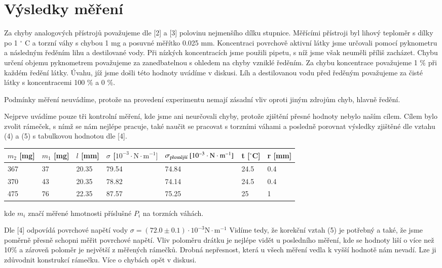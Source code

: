 \documentclass[a4paper]{article}
\begin{document}
\section*{Výsledky měření}
\par Za chyby analogových přístrojů považujeme dle [2] a [3] polovinu nejmenšího dílku stupnice. Měřícími přístroji byl lihový teploměr s dílky po 1 $^\circ$ C a torzní váhy s chybou 1 mg a posuvné měřítko 0.025 mm. Koncentraci povrchově aktivní látky jsme určovali pomocí pyknometru a následným ředěním lihu a destilované vody. Při nízkých koncentracích jsme použili pipetu, s níž jsme však neuměli příliš zacházet. Chybu určení objemu pyknometrem považujeme za zanedbatelnou s ohledem na chyby vzniklé ředěním. Za chybu koncentrace považujeme 1 $\%$ při každém ředění látky. Úvahu, jíž jsme došli této hodnoty uvádíme v diskusi. Líh a destilovanou vodu před ředěným považujeme za čisté látky s koncentracemi 100 $\%$ a 0 $\%$.
\par Podmínky měření neuvádíme, protože na provedení experimentu nemají zásadní vliv oproti jiným zdrojům chyb, hlavně ředění.
\par Nejprve uvádíme pouze tři kontrolní měření, kde jsme ani neurčovali chyby, protože zjištění přesné hodnoty nebylo naším cílem. Cílem bylo zvolit rámeček, s nímž se nám nejlépe pracuje, také naučit se pracovat s torzními váhami a posledně porovnat výsledky zjištěné dle vztahu (4) a (5) s tabulkovou hodnotou dle [4].
\begin{center}
     \label{tab:title}
    \begin{tabular}{ | l | l | l | l | l | l | p{3cm} |} \hline
    $m_{2}$ [mg] & $m_{1}$ [mg] & $l$ [mm] & $\sigma$  [$10^{-3} \cdot  \mathrm {N \cdot m^{-1}}]$ & $\sigma_{\textnormal{přesnější}} \: [10^{-3} \cdot \mathrm{N \cdot m^{-1}]}$ & t [$^\circ$C] & r [mm] \\ \hline
    367 & 37 & 20.35 & 79.54 & 74.84 & 24.5 & 0.4 \\ \hline
    370 & 43 & 20.35 & 78.82 & 74.14 & 24.5 & 0.4 \\ \hline
    475 & 76 & 22.35 & 87.57 & 75.25 & 25   & 1   \\ \hline
    \end{tabular}
\end{center}
kde $m_{i}$ značí měřené hmotnosti příslušné $P_{i}$ na torzních váhách.
\par Dle [4] odpovídá povrchové napětí vody $\sigma = (72.0\pm0.1) \cdot 10^{-3} \mathrm{N \cdot m^{-1}}$ Vidíme tedy, že korekční vztah (5) je potřebný a také, že jsme poměrně přesně schopni měřit povrchové napětí. Vliv poloměru drátku je nejlépe vidět u posledního měření, kde se hodnoty liší o více než 10$\%$ a zároveň poloměr je největší z měřených rámečků. Drobná nepřesnost, která u všech měření vedla k vyšší hodnotě nám nevadí. Lze ji zdůvodnit konstrukcí rámečku. Více o chybách opět v diskusi.
\end{document}
